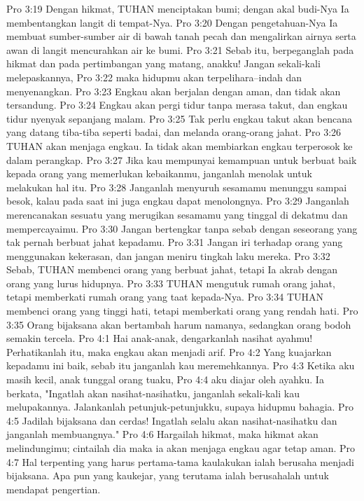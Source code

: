 Pro 3:19  Dengan hikmat, TUHAN menciptakan bumi; dengan akal budi-Nya Ia membentangkan langit di tempat-Nya.
Pro 3:20  Dengan pengetahuan-Nya Ia membuat sumber-sumber air di bawah tanah pecah dan mengalirkan airnya serta awan di langit mencurahkan air ke bumi.
Pro 3:21  Sebab itu, berpeganglah pada hikmat dan pada pertimbangan yang matang, anakku! Jangan sekali-kali melepaskannya,
Pro 3:22  maka hidupmu akan terpelihara--indah dan menyenangkan.
Pro 3:23  Engkau akan berjalan dengan aman, dan tidak akan tersandung.
Pro 3:24  Engkau akan pergi tidur tanpa merasa takut, dan engkau tidur nyenyak sepanjang malam.
Pro 3:25  Tak perlu engkau takut akan bencana yang datang tiba-tiba seperti badai, dan melanda orang-orang jahat.
Pro 3:26  TUHAN akan menjaga engkau. Ia tidak akan membiarkan engkau terperosok ke dalam perangkap.
Pro 3:27  Jika kau mempunyai kemampuan untuk berbuat baik kepada orang yang memerlukan kebaikanmu, janganlah menolak untuk melakukan hal itu.
Pro 3:28  Janganlah menyuruh sesamamu menunggu sampai besok, kalau pada saat ini juga engkau dapat menolongnya.
Pro 3:29  Janganlah merencanakan sesuatu yang merugikan sesamamu yang tinggal di dekatmu dan mempercayaimu.
Pro 3:30  Jangan bertengkar tanpa sebab dengan seseorang yang tak pernah berbuat jahat kepadamu.
Pro 3:31  Jangan iri terhadap orang yang menggunakan kekerasan, dan jangan meniru tingkah laku mereka.
Pro 3:32  Sebab, TUHAN membenci orang yang berbuat jahat, tetapi Ia akrab dengan orang yang lurus hidupnya.
Pro 3:33  TUHAN mengutuk rumah orang jahat, tetapi memberkati rumah orang yang taat kepada-Nya.
Pro 3:34  TUHAN membenci orang yang tinggi hati, tetapi memberkati orang yang rendah hati.
Pro 3:35  Orang bijaksana akan bertambah harum namanya, sedangkan orang bodoh semakin tercela.
Pro 4:1  Hai anak-anak, dengarkanlah nasihat ayahmu! Perhatikanlah itu, maka engkau akan menjadi arif.
Pro 4:2  Yang kuajarkan kepadamu ini baik, sebab itu janganlah kau meremehkannya.
Pro 4:3  Ketika aku masih kecil, anak tunggal orang tuaku,
Pro 4:4  aku diajar oleh ayahku. Ia berkata, "Ingatlah akan nasihat-nasihatku, janganlah sekali-kali kau melupakannya. Jalankanlah petunjuk-petunjukku, supaya hidupmu bahagia.
Pro 4:5  Jadilah bijaksana dan cerdas! Ingatlah selalu akan nasihat-nasihatku dan janganlah membuangnya."
Pro 4:6  Hargailah hikmat, maka hikmat akan melindungimu; cintailah dia maka ia akan menjaga engkau agar tetap aman.
Pro 4:7  Hal terpenting yang harus pertama-tama kaulakukan ialah berusaha menjadi bijaksana. Apa pun yang kaukejar, yang terutama ialah berusahalah untuk mendapat pengertian.
